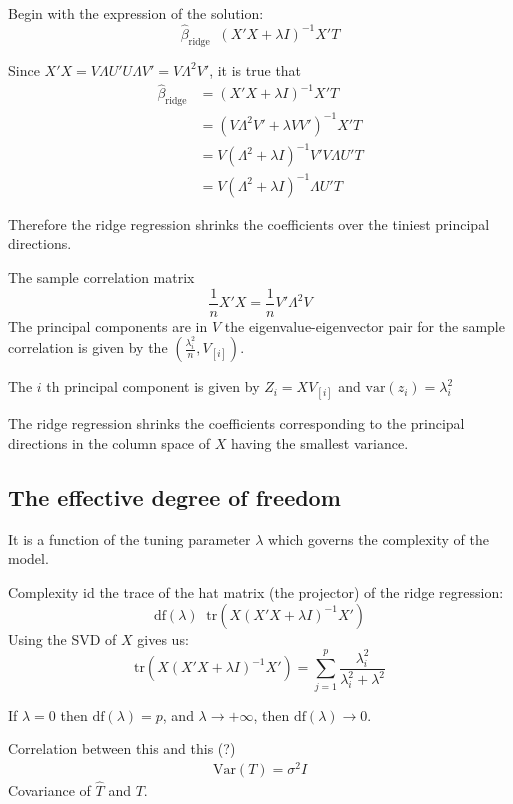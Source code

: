 \documentclass[a4paper]{article}
\newcommand{\clo}[1]{{\left [ #1 \right ]}}
\newcommand{\brac}[1]{{\left ( #1 \right )}}
\newcommand{\defn}{\mathop{\overset{\Delta}{=}}\nolimits}
\begin{document}
Begin with the expression of the solution:
\[\hat{\beta}_{\text{ridge}} \defn \brac{X'X + \lambda I}^{-1} X'T\]

Since $X'X = V\Lambda U' U \Lambda V' = V\Lambda^2 V'$, it is true that 
\begin{align*}
	\hat{\beta}_{\text{ridge}} & = \brac{X'X + \lambda I}^{-1} X'T\\
	& = \brac{V\Lambda^2 V' + \lambda VV'}^{-1} X'T\\
	& = V \brac{\Lambda^2 + \lambda I}^{-1} V' V\Lambda U' T \\
	& = V \brac{\Lambda^2 + \lambda I}^{-1} \Lambda U' T
\end{align*}

Therefore the ridge regression shrinks the coefficients over the tiniest principal directions.

The sample correlation matrix
\[\frac{1}{n} X'X = \frac{1}{n} V'\Lambda^2 V\]
The principal components are in $V$
the eigenvalue-eigenvector pair for the sample correlation is given by the $\brac{\frac{\lambda_i^2}{n}, V_\clo{i}}$.

The $i$ th principal component is given by $Z_i = X V_\clo{i}$ and $\text{var}(z_i) = \lambda_i^2$

The ridge regression shrinks the coefficients corresponding to the principal directions in the column space of $X$ having the smallest variance.


\subsection*{The effective degree of freedom} %
\label{sub:the_effective_degree_of_freedom}

It is a function of the tuning parameter $\lambda$ which governs the complexity of the model.

Complexity id the trace of the hat matrix (the projector) of the ridge regression:
\[\text{df}(\lambda) \defn \text{tr}\brac{X\brac{X'X + \lambda I}^{-1}X'}\]
Using the SVD of $X$ gives us:
\[\text{tr}\brac{X\brac{X'X + \lambda I}^{-1}X'} = \sum_{j=1}^p \frac{\lambda_i^2}{\lambda_i^2 + \lambda^2}\]

If $\lambda = 0$ then $\text{df}(\lambda) = p$, and $\lambda\to +\infty$, then $\text{df}(\lambda) \to 0$.

Correlation between this and this (?)
\begin{align*}
	\text{Var}(T) = \sigma^2 I
\end{align*}
Covariance of $\hat{T}$ and $T$.
\end{document}
